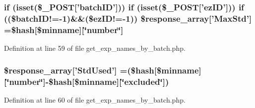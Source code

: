 \hypertarget{get__exp__names__by__batch_8php_a1fb972d1e2547fe562f66e66a72523f2}{
\subsubsection[{\$response\-\_\-array}]{\setlength{\rightskip}{0pt plus 5cm}if (isset(\$\-\_\-\-P\-O\-S\-T\mbox{[}'{\bf batch\-I\-D}'\mbox{]})) if (isset(\$\-\_\-\-P\-O\-S\-T\mbox{[}'{\bf ez\-I\-D}'\mbox{]})) if ((\$batch\-I\-D!=-\/1)\&\&(\$ez\-I\-D!=-\/1)) \$response\-\_\-array\mbox{[}'Max\-Std'\mbox{]} =\$hash\mbox{[}\$minname\mbox{]}\mbox{[}\char`\"{}number\char`\"{}\mbox{]}}}\label{get__exp__names__by__batch_8php_a1fb972d1e2547fe562f66e66a72523f2}


Definition at line 59 of file get\-\_\-exp\-\_\-names\-\_\-by\-\_\-batch.\-php.

\hypertarget{get__exp__names__by__batch_8php_af1aae1e270d9c73099bf08cba661e291}{
\subsubsection[{\$response\-\_\-array}]{\setlength{\rightskip}{0pt plus 5cm}\$response\-\_\-array\mbox{[}'Std\-Used'\mbox{]} =(\$hash\mbox{[}\$minname\mbox{]}\mbox{[}\char`\"{}number\char`\"{}\mbox{]}-\/\$hash\mbox{[}\$minname\mbox{]}\mbox{[}\char`\"{}excluded\char`\"{}\mbox{]})}}\label{get__exp__names__by__batch_8php_af1aae1e270d9c73099bf08cba661e291}


Definition at line 60 of file get\-\_\-exp\-\_\-names\-\_\-by\-\_\-batch.\-php.

